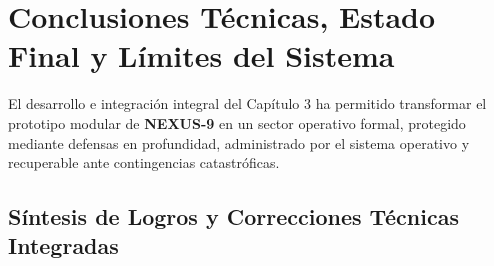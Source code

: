 \documentclass[10pt,a4paper]{article}
\begin{document}
\section{Conclusiones Técnicas, Estado Final y Límites del Sistema}
\label{sec:conclusiones}

El desarrollo e integración integral del Capítulo 3 ha permitido transformar el prototipo modular de \textbf{NEXUS-9} en un sector operativo formal, protegido mediante defensas en profundidad, administrado por el sistema operativo y recuperable ante contingencias catastróficas.

\subsection{Síntesis de Logros y Correcciones Técnicas Integradas}
\end{document}
